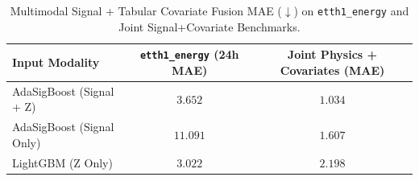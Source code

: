 \begin{table}[t]
\centering
\caption{Multimodal Signal + Tabular Covariate Fusion MAE ($\downarrow$) on \texttt{etth1\_energy} and Joint Signal+Covariate Benchmarks.}
\label{tab:multimodal}
\begin{tabular}{lcc}
\toprule
Input Modality & \texttt{etth1\_energy} (24h MAE) & Joint Physics + Covariates (MAE) \\
\midrule
AdaSigBoost (Signal + Z) & $3.652$ & $1.034$ \\
AdaSigBoost (Signal Only) & $11.091$ & $1.607$ \\
LightGBM (Z Only) & $3.022$ & $2.198$ \\
\bottomrule
\end{tabular}
\end{table}
